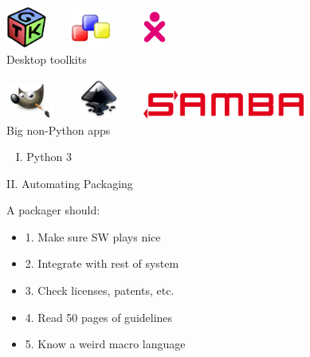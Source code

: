 \documentclass[1610,20pt]{beamer}
\newcommand\sk{\par\bigskip\bigskip\par}
\begin{document}
\begin{center}
\begin{frame}[fragile]
    \sk


    \includegraphics[width=0.1\textwidth]{gtk} ~~~
    \includegraphics[width=0.1\textwidth]{wx-logo} ~~~
    \includegraphics[width=0.1\textwidth]{sugar} \\
    Desktop toolkits

    \sk

    \includegraphics[width=0.12\textwidth]{gimp} ~~~
    \includegraphics[width=0.1\textwidth]{inkscape-logo} ~~~
    \includegraphics[width=0.4\textwidth]{Logo_Samba} \\
    Big non-Python apps

\end{frame}

{
\begin{frame}[fragile]~
    {\color{mutegray} I. Python 3}

    \sk\color{white}

    \huge
    II. Automating Packaging
\end{frame}
}

\begin{frame}[fragile]
    A packager should:
    \small

    \begin{itemize}
    \item{1.} Make sure SW plays nice
    \item{2.} Integrate with rest of system
    \item{3.} Check licenses, patents, etc.
    \pause
    \item{4.} Read 50 pages of guidelines
    \item{5.} Know a weird macro language
    \end{itemize}
\end{frame}


\end{center}
\end{document}

